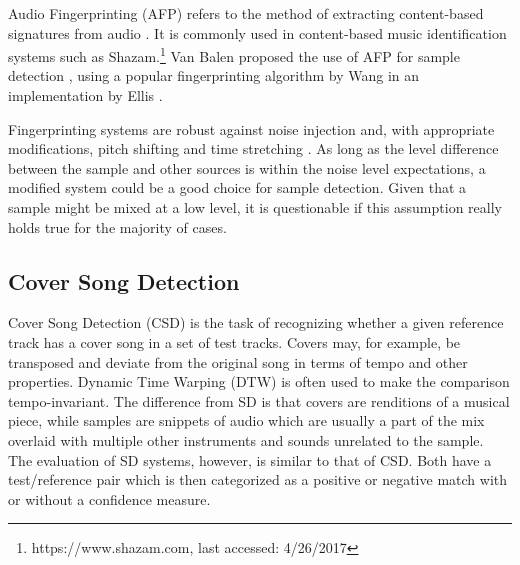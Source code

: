 \documentclass{article}
\begin{document}
Audio Fingerprinting (AFP) refers to the method of extracting content-based signatures from audio \cite{cano2005review,haitsma2002highly,baluja2007audio}. It is commonly used in content-based music identification systems such as Shazam.\footnote{https://www.shazam.com, last accessed: 4/26/2017}
Van Balen proposed the use of AFP for sample detection \cite{van2011automatic,van2012automatic}, using a popular fingerprinting algorithm by Wang \cite{wang2003industrial} in an implementation by Ellis \cite{ellisfinger}. 


Fingerprinting systems are robust against noise injection and, with appropriate modifications, pitch shifting and time stretching \cite{zhu2010novel}. As long as the level difference between the sample and other sources is within the noise level expectations, a modified system could be a good choice for sample detection. Given that a sample might be mixed at a low level, it is questionable if this assumption really holds true for the majority of cases.

\subsection{Cover Song Detection}
Cover Song Detection (CSD) is the task of recognizing whether a given reference track has a cover song in a set of test tracks\cite{Ellis2007Cover,ravuri2010cover,bertin2011large}.
Covers may, for example, be transposed and deviate from the original song in terms of tempo and other properties. Dynamic Time Warping (DTW) \cite{sakoe1978dynamic} is often used to make the comparison tempo-invariant. The difference from SD is that covers are renditions of a musical piece, while samples are snippets of audio which are usually a part of the mix overlaid with multiple other instruments and sounds unrelated to the sample.
%
The evaluation of SD systems, however, is similar to that of CSD. Both have a test/reference pair which is then categorized as a positive or negative match with or without a confidence measure. %
\end{document}
